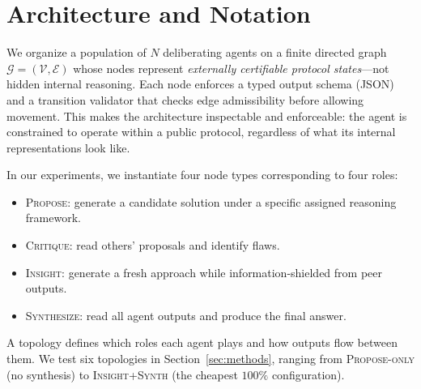 \documentclass[11pt]{amsart}
\newcommand\1{{\mathds{1}}}
\newcommand\V{{\mathcal{V}}}
\newcommand\G{{\mathcal{G}}}
\theoremstyle{definition}
\theoremstyle{remark}
\numberwithin{equation}{section}
\begin{document}
\section{Architecture and Notation}\label{sec:arch}

We organize a population of $N$ deliberating agents on a finite directed graph $\G = (\V, \mathcal{E})$ whose nodes represent \emph{externally certifiable protocol states}---not hidden internal reasoning.
Each node enforces a typed output schema (JSON) and a transition validator that checks edge admissibility before allowing movement.
This makes the architecture inspectable and enforceable: the agent is constrained to operate within a public protocol, regardless of what its internal representations look like.

In our experiments, we instantiate four node types corresponding to four roles:
\begin{itemize}[leftmargin=1.2em, itemsep=2pt]
\item \textsc{Propose}: generate a candidate solution under a specific assigned reasoning framework.
\item \textsc{Critique}: read others' proposals and identify flaws.
\item \textsc{Insight}: generate a fresh approach while information-shielded from peer outputs.
\item \textsc{Synthesize}: read all agent outputs and produce the final answer.
\end{itemize}
A topology defines which roles each agent plays and how outputs flow between them. We test six topologies in Section~\ref{sec:methods}, ranging from \textsc{Propose-only} (no synthesis) to \textsc{Insight+Synth} (the cheapest $100\%$ configuration).
\end{document}
